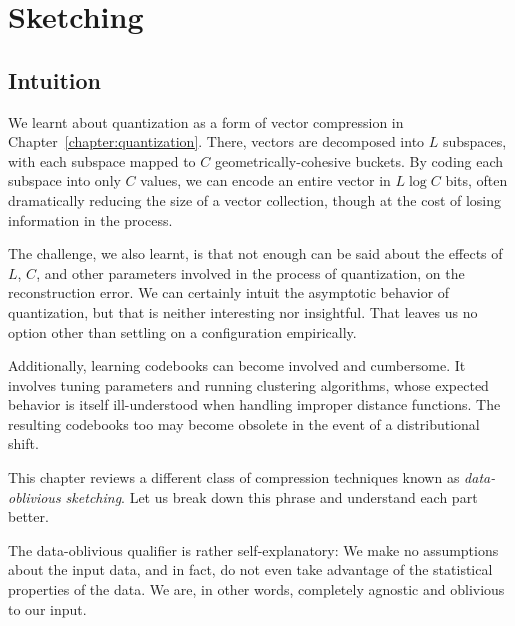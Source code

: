 \chapter{Sketching}
\label{chapter:sketching}


\section{Intuition}

We learnt about quantization as a form of vector compression in Chapter~\ref{chapter:quantization}.
There, vectors are decomposed into $L$ subspaces, with each subspace
mapped to $C$ geometrically-cohesive buckets.
By coding each subspace into only $C$ values, we can encode an entire vector in $L \log C$ bits,
often dramatically reducing the size of a vector collection, though at the cost of
losing information in the process.

The challenge, we also learnt, is that not enough can be said about the effects of
$L$, $C$, and other parameters involved in the process of quantization,
on the reconstruction error. We can certainly intuit the asymptotic behavior of quantization,
but that is neither interesting nor insightful. That leaves us no option
other than settling on a configuration empirically.

Additionally, learning codebooks can become involved and cumbersome.
It involves tuning parameters and running clustering algorithms,
whose expected behavior is itself ill-understood when handling improper distance functions.
The resulting codebooks too may become obsolete in the event of a distributional shift.

This chapter reviews a different class of compression techniques known as
\emph{data-oblivious sketching}. Let us break down this phrase and understand each part better.

The data-oblivious qualifier is rather self-explanatory:
We make no assumptions about the input data, and in fact, do not
even take advantage of the statistical properties of the data.
We are, in other words, completely agnostic and oblivious to our input.

